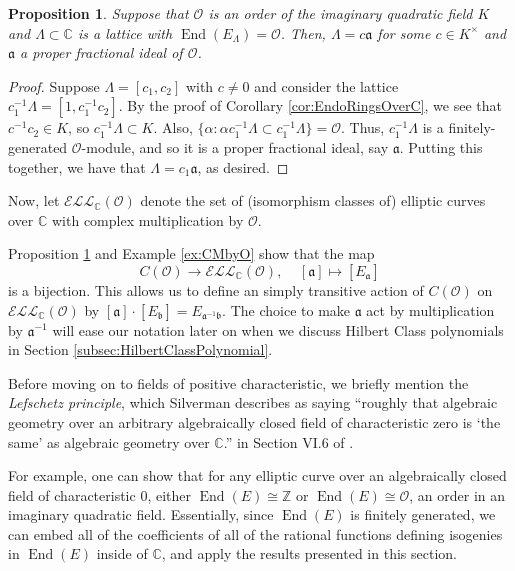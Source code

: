 \documentclass{amsart}
\newtheorem{prop}[thm]{Proposition}
\theoremstyle{definition}
\theoremstyle{remark}
\numberwithin{equation}{section}
\newcommand{\cE}{\mathcal E}
\newcommand{\cL}{\mathcal L}
\newcommand{\cO}{\mathcal O}
\newcommand{\fka}{\mathfrak a}
\newcommand{\fkb}{\mathfrak b}
\newcommand{\bbC}{\mathbb C}
\newcommand{\bbZ}{\mathbb Z}
\newcommand{\inv}{^{-1}}
\newcommand{\ELL}{\cE\cL\cL}
\DeclareMathOperator{\End}{End}
\begin{document}
 \begin{prop} \label{prop:CMByOisProperOIdeal}
 Suppose that $\cO$ is an order of the imaginary quadratic field $K$ and $\Lambda \subset \bbC$ is a lattice with $\End(E_{\Lambda}) = \cO$. Then, $\Lambda = c\fka$ for some $c \in K^\times$ and $\fka$ a proper fractional ideal of $\cO$.
 \end{prop}
 
 \begin{proof}
 Suppose $\Lambda = [c_{1}, c_{2}]$ with $c \neq 0$ and consider the lattice $c_1\inv \Lambda = [1, c_1\inv c_{2}]$. By the proof of Corollary \ref{cor:EndoRingsOverC}, we see that $c\inv c_{2} \in K$, so $c_{1}\inv \Lambda \subset K$. Also,  $\{\alpha: \alpha c_{1}\inv \Lambda \subset c_{1}\inv \Lambda\} = \cO$. Thus, $c_{1}\inv \Lambda$ is a finitely-generated $\cO$-module, and so it is a proper fractional ideal, say $\fka$. Putting this together, we have that $\Lambda = c_1 \fka$, as desired.
 \end{proof}
 
 Now, let $\ELL_{\bbC}(\cO)$ denote the set of (isomorphism classes  of) elliptic curves over $\bbC$ with complex multiplication by $\cO$.
 
 Proposition \ref{prop:CMByOisProperOIdeal} and Example \ref{ex:CMbyO} show that the map
 \[
 C(\cO) \to \ELL_{\bbC}(\cO), \ \ \ \ \  [\fka] \mapsto [E_{\fka}]
 \]
 is a bijection. 
  This allows us to define an simply transitive action of $C(\cO)$ on $\ELL_{\bbC}(\cO)$ by $[\fka]\cdot [E_{\fkb}] = E_{\fka\inv \fkb}$. The choice to make $\fka$ act by multiplication by $\fka\inv$ will ease our notation later on when we discuss Hilbert Class polynomials in Section \ref{subsec:HilbertClassPolynomial}.
 
 Before moving on to fields of positive characteristic, we briefly mention the \emph{Lefschetz principle}, which Silverman describes as saying ``roughly that algebraic geometry over an arbitrary algebraically closed field of characteristic zero is `the same' as algebraic geometry over $\bbC$.'' in Section VI.6 of \cite{SilvermanAEC}.
 
 For example, one can show that for any elliptic curve over an algebraically closed field of characteristic $0$, either $\End(E) \cong \bbZ$ or $\End(E) \cong \cO$, an order in an imaginary quadratic field. Essentially, since $\End(E)$ is finitely generated, we can embed all of the coefficients of all of the rational functions defining isogenies in $\End(E)$ inside of $\bbC$, and apply the results presented in this section.
  
\end{document}
